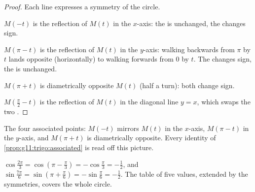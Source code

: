 \begin{proof}
Each line expresses a symmetry of the circle.

$M(-t)$ is the reflection of $M(t)$ in the $x$-axis: the  is
unchanged, the  changes sign.

$M(\pi - t)$ is the reflection of $M(t)$ in the $y$-axis: walking
backwards from $\pi$ by $t$ lands opposite (horizontally) to walking
forwards from $0$ by $t$. The  changes sign, the  is
unchanged.

$M(\pi + t)$ is diametrically opposite $M(t)$ (half a turn): both
 change sign.

$M\!\left(\frac\pi2 - t\right)$ is the reflection of $M(t)$ in the
diagonal line $y = x$, which swaps the two .
\end{proof}

\begin{omfigure}

{\small The four associated points: $M(-t)$ mirrors $M(t)$ in the
$x$-axis, $M(\pi - t)$ in the $y$-axis, and $M(\pi + t)$ is diametrically
opposite. Every identity of \cref{prop:g11:trigo:associated} is read off
this picture.}
\end{omfigure}

\begin{example}
$\cos\frac{2\pi}{3} = \cos\left(\pi - \frac\pi3\right)
= -\cos\frac\pi3 = -\frac12$, and
$\sin\frac{7\pi}{6} = \sin\left(\pi + \frac\pi6\right)
= -\sin\frac\pi6 = -\frac12$. The table of five values, extended by the
symmetries, covers the whole circle.
\end{example}

